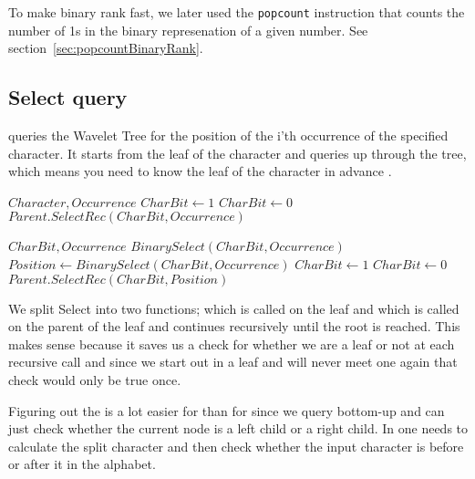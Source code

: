 To make binary rank fast, we later used the \texttt{popcount} instruction that counts the number of 1s in the binary represenation of a given number. See section~\ref{sec:popcountBinaryRank}.

\subsection{Select query}
 queries the Wavelet Tree for the position of the i'th occurrence of the specified character.
It starts from the leaf of the character and queries up through the tree, which means you need to know the leaf of the character in advance \citep{Claude08practicalrankselect}. 


\begin{mdframed}[nobreak]
\begin{algorithmic} 
 {$Character, Occurrence$}
	\State $CharBit \gets 1$
\Else
	\State $CharBit \gets 0$
\EndIf
\State \Return $Parent.SelectRec(CharBit, Occurrence)$
\EndFunction
\end{algorithmic}
\end{mdframed}


\begin{mdframed}[nobreak]
\begin{algorithmic} 
 {$CharBit, Occurrence$}
	\State \Return $BinarySelect(CharBit, Occurrence)$
\EndIf
\State $Position \gets BinarySelect(CharBit, Occurrence)$
	\State $CharBit \gets 1$
\Else
	\State $CharBit \gets 0$
\EndIf
\State \Return $Parent.SelectRec(CharBit, Position)$
\EndFunction
\end{algorithmic}
\end{mdframed}


We split Select into two functions;  which is called on the leaf and  which is called on the parent of the leaf and continues recursively until the root is reached. 
This makes sense because it saves us a check for whether we are a leaf or not at each recursive call and since we start out in a leaf and will never meet one again that check would only be true once. 

Figuring out the  is a lot easier for  than for  since we query bottom-up and can just check whether the current node is a left child or a right child. 
In  one needs to calculate the split character and then check whether the input character is before or after it in the alphabet.

